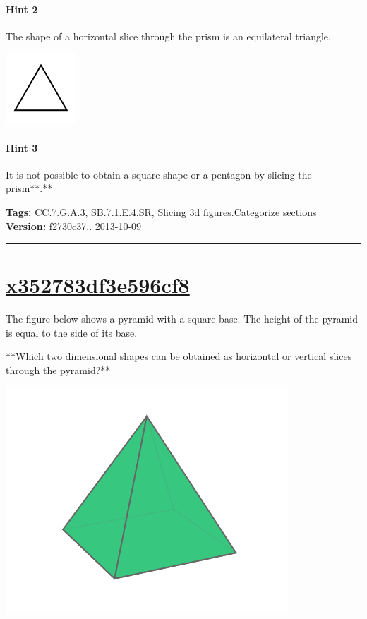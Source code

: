 \documentclass[twocolumn,10pt]{article}
\def\shrinkfactor{0.4}
\begin{document}
\paragraph{Hint 2}The shape of a horizontal slice through the prism is an equilateral triangle.    

\includegraphics[scale=\shrinkfactor]{figures/15c855a8a232e6c1873c5f46769050a9c13051b8.png}

\paragraph{Hint 3}It is not possible to obtain a square shape or a pentagon by slicing the prism**.**




\medskip
\noindent
\textbf{Tags:} {\footnotesize CC.7.G.A.3, SB.7.1.E.4.SR, Slicing 3d figures.Categorize sections}\\
\textbf{Version:} f2730c37.. 2013-10-09
\smallskip\hrule





\section{\href{https://www.khanacademy.org/devadmin/content/items/x352783df3e596cf8}{x352783df3e596cf8}}

\noindent
The figure below shows a pyramid with a square base. The height of the pyramid is equal to the side of its base. 

**Which two dimensional shapes can be obtained as  horizontal or vertical slices through the pyramid?**  


\includegraphics[scale=\shrinkfactor]{figures/1d9b248d33b33b47f6b0bcbfae27cf51e2c208c7.png}
\end{document}
